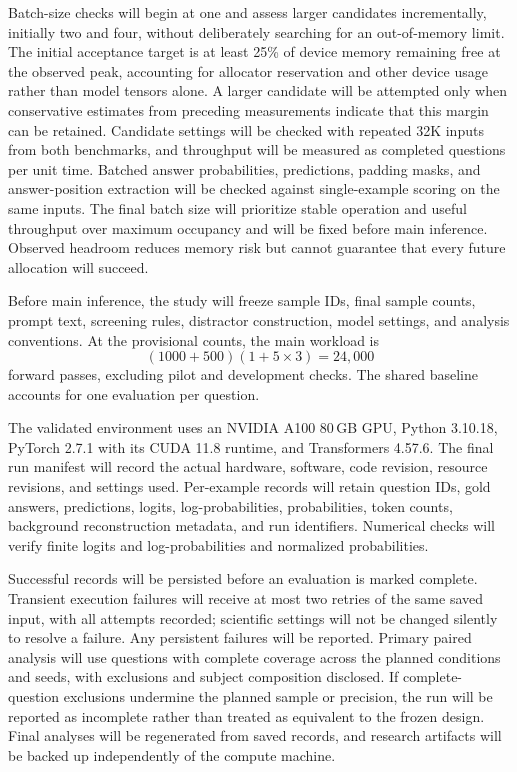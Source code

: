 \documentclass[conference]{IEEEtran}
\begin{document}
Batch-size checks will begin at one and assess larger candidates incrementally, initially two and four, without deliberately searching for an out-of-memory limit. The initial acceptance target is at least 25\% of device memory remaining free at the observed peak, accounting for allocator reservation and other device usage rather than model tensors alone. A larger candidate will be attempted only when conservative estimates from preceding measurements indicate that this margin can be retained. Candidate settings will be checked with repeated 32K inputs from both benchmarks, and throughput will be measured as completed questions per unit time. Batched answer probabilities, predictions, padding masks, and answer-position extraction will be checked against single-example scoring on the same inputs. The final batch size will prioritize stable operation and useful throughput over maximum occupancy and will be fixed before main inference. Observed headroom reduces memory risk but cannot guarantee that every future allocation will succeed.

Before main inference, the study will freeze sample IDs, final sample counts, prompt text, screening rules, distractor construction, model settings, and analysis conventions. At the provisional counts, the main workload is
\begin{equation}
(1000+500)\left(1+5\times3\right)=24{,}000
\end{equation}
forward passes, excluding pilot and development checks. The shared baseline accounts for one evaluation per question.

The validated environment uses an NVIDIA A100 80\,GB GPU, Python 3.10.18, PyTorch 2.7.1 with its CUDA 11.8 runtime, and Transformers 4.57.6. The final run manifest will record the actual hardware, software, code revision, resource revisions, and settings used. Per-example records will retain question IDs, gold answers, predictions, logits, log-probabilities, probabilities, token counts, background reconstruction metadata, and run identifiers. Numerical checks will verify finite logits and log-probabilities and normalized probabilities.

Successful records will be persisted before an evaluation is marked complete. Transient execution failures will receive at most two retries of the same saved input, with all attempts recorded; scientific settings will not be changed silently to resolve a failure. Any persistent failures will be reported. Primary paired analysis will use questions with complete coverage across the planned conditions and seeds, with exclusions and subject composition disclosed. If complete-question exclusions undermine the planned sample or precision, the run will be reported as incomplete rather than treated as equivalent to the frozen design. Final analyses will be regenerated from saved records, and research artifacts will be backed up independently of the compute machine.
\end{document}
